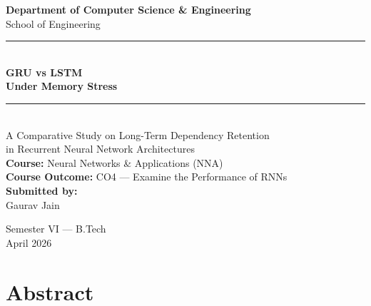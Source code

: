 \documentclass[12pt, a4paper]{article}
\begin{document}
\begin{titlepage}
    \centering
    \vspace*{1cm}

    {\Large\bfseries Department of Computer Science \& Engineering}\\[0.3cm]
    {\large School of Engineering}\\[1.5cm]

    \rule{\textwidth}{1.5pt}\\[0.5cm]
    {\Huge\bfseries\color{primaryblue} GRU vs LSTM\\[0.3cm] Under Memory Stress}\\[0.5cm]
    \rule{\textwidth}{1.5pt}\\[1.5cm]

    {\Large A Comparative Study on Long-Term Dependency Retention\\
    in Recurrent Neural Network Architectures}\\[2cm]

    {\large\textbf{Course:} Neural Networks \& Applications (NNA)}\\[0.3cm]
    {\large\textbf{Course Outcome:} CO4 — Examine the Performance of RNNs}\\[2cm]

    {\large\textbf{Submitted by:}}\\[0.3cm]
    {\large Gaurav Jain}\\[0.2cm]

    \vfill

    {\large Semester VI — B.Tech}\\[0.3cm]
    {\large April 2026}

\end{titlepage}

\newpage
\tableofcontents
\newpage

\section{Abstract}
\end{document}
